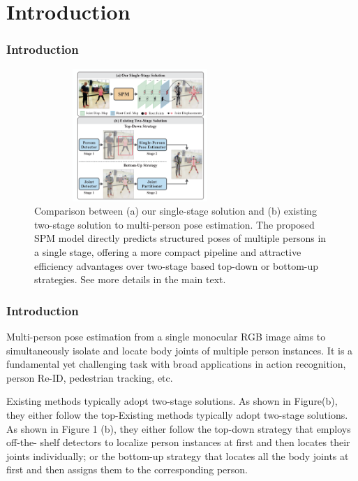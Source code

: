\frame[plain]{\titlepage}

\section{Introduction}

\begin{frame}
	\frametitle{Introduction}
	\begin{figure}[h]
\centering
\includegraphics[width=8cm,height=5cm]{imgs/1.png}
\caption{Comparison between (a) our single-stage solution and (b) existing two-stage solution to multi-person pose estimation. The proposed SPM model directly predicts structured poses of multiple persons in a single stage, offering a more compact pipeline and attractive efficiency advantages over two-stage based top-down or bottom-up strategies. See more details in the main text.}
\end{figure}
\end{frame}

\begin{frame}
    \frametitle{Introduction}
    
    Multi-person pose estimation from a single monocular RGB image aims to simultaneously isolate and locate body joints of multiple person instances. It is a fundamental yet challenging task with broad applications in action recognition, person Re-ID, pedestrian tracking, etc.

    \vspace{0.4cm}

    \pause
    
   Existing methods typically adopt two-stage solutions. As shown in Figure(b), they either follow the top-Existing methods typically adopt two-stage solutions. As shown in Figure 1 (b), they either follow the top-down strategy that employs off-the- shelf detectors to localize person instances at first and then locates their joints individually; or the bottom-up strategy that locates all the body joints at first and then assigns them to the corresponding person. 
    
\end{frame}

